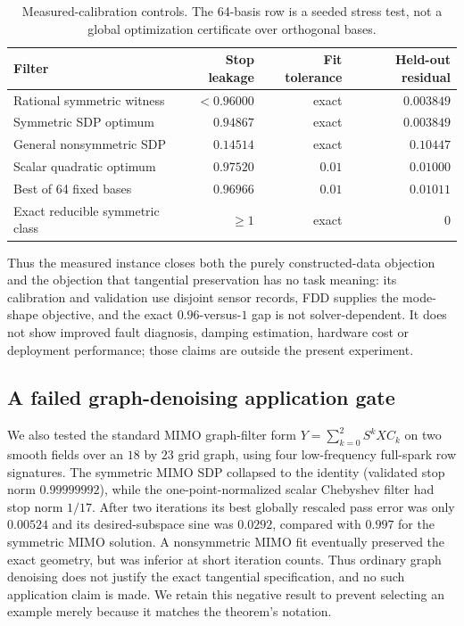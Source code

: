 \documentclass[11pt]{article}
\theoremstyle{remark}
\begin{document}
\begin{table}[H]
\centering
\small
\begin{tabular}{@{}lrrr@{}}
\toprule
Filter & Stop leakage & Fit tolerance & Held-out residual\\
\midrule
Rational symmetric witness & $<0.96000$ & exact & $0.003849$\\
Symmetric SDP optimum & $0.94867$ & exact & $0.003849$\\
General nonsymmetric SDP & $0.14514$ & exact & $0.10447$\\
Scalar quadratic optimum & $0.97520$ & $0.01$ & $0.01000$\\
Best of 64 fixed bases & $0.96966$ & $0.01$ & $0.01011$\\
Exact reducible symmetric class & $\ge1$ & exact & $0$\\
\bottomrule
\end{tabular}
\caption{Measured-calibration controls.  The 64-basis row is a seeded stress
test, not a global optimization certificate over orthogonal bases.}
\label{tab:vblresults}
\end{table}

Thus the measured instance closes both the purely constructed-data objection
and the objection that tangential preservation has no task meaning: its
calibration and validation use disjoint sensor records, FDD supplies the
mode-shape objective, and the exact $0.96$-versus-$1$ gap is not
solver-dependent.  It does not show improved fault diagnosis, damping
estimation, hardware cost or deployment performance; those claims are outside
the present experiment.

\subsection{A failed graph-denoising application gate}

We also tested the standard MIMO graph-filter form
$Y=\sum_{k=0}^{2}S^kXC_k$ on two smooth fields over an $18$ by $23$ grid
graph, using four low-frequency full-spark row signatures.  The symmetric MIMO
SDP collapsed to the identity (validated stop norm $0.99999992$), while the
one-point-normalized scalar Chebyshev filter had stop norm $1/17$.  After two
iterations its best globally rescaled pass error was only $0.00524$ and its
desired-subspace sine was $0.0292$, compared with $0.997$ for the symmetric
MIMO solution.  A nonsymmetric MIMO fit eventually preserved the exact
geometry, but was inferior at short iteration counts.  Thus ordinary graph
denoising does not justify the exact tangential specification, and no such
application claim is made.  We retain this negative result to prevent selecting
an example merely because it matches the theorem's notation.
\end{document}
